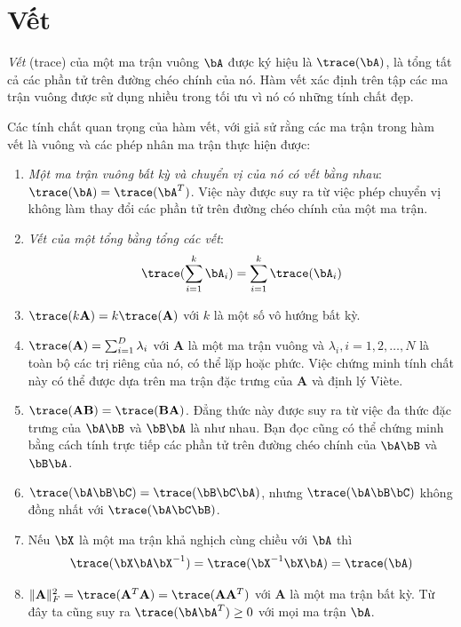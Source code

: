 \section{Vết}
\textit{Vết} (trace) của một ma trận vuông $\bA$ được ký hiệu là $\trace(\bA)$, là tổng
tất cả các phần tử trên đường chéo chính của nó. Hàm vết xác định trên tập các
ma trận vuông được sử dụng nhiều trong tối ưu vì nó có những tính chất đẹp.

Các tính chất quan trọng của hàm vết, với giả sử rằng các ma trận trong hàm
vết là vuông và các phép nhân ma trận thực hiện được:
\begin{enumerate}
    \item \textit{Một ma trận vuông bất kỳ và chuyển vị của nó có vết bằng
    nhau}: $\trace(\bA) = \trace(\bA^T)$. Việc này được suy ra từ việc phép
    chuyển vị không làm thay đổi các phần tử trên đường chéo chính của một ma
    trận.


    \item \textit{Vết của một tổng bằng tổng các vết}: 
    $$\displaystyle\trace(\sum_{i=1}^k \bA_i) = \sum_{i=1}^k \trace(\bA_i)$$

    \item $\trace(k\mathbf{A}) = k\trace(\mathbf{A})$ với $k$ là một
    số vô hướng bất kỳ.

    \item $\trace(\mathbf{A}) = \sum_{i = 1}^D \lambda_i $ với
    $\mathbf{A}$ là một ma trận vuông và $\lambda_i, i = 1, 2, \dots, N$ là toàn
    bộ các trị riêng của nó, có thể lặp hoặc phức. Việc chứng minh tính chất này
    có thể được dựa trên ma trận đặc trưng của $\mathbf{A}$ và định lý Viète.

    \item $\trace(\mathbf{AB}) = \trace(\mathbf{BA})$. Đẳng thức này
    được suy ra từ việc đa thức đặc trưng của $\bA\bB$ và $\bB\bA$ là như nhau.
    Bạn đọc cũng có thể chứng minh bằng cách tính trực tiếp các phần tử trên
    đường chéo chính của $\bA\bB$ và $\bB\bA$.

    \item $\trace(\bA\bB\bC) = \trace(\bB\bC\bA)$, nhưng $\trace(\bA\bB\bC)$
    không đồng nhất với $\trace(\bA\bC\bB)$.

    \item Nếu $\bX$ là một ma trận khả nghịch cùng chiều với $\bA$ thì
    \begin{equation*}
        \trace (\bX\bA\bX^{-1}) = \trace(\bX^{-1}\bX\bA) = \trace(\bA)
    \end{equation*}
    \item $\|\mathbf{A}\|_F^2 = \trace(\mathbf{A}^T\mathbf{A}) =
    \trace(\mathbf{A}\mathbf{A}^T)$ với $\mathbf{A}$ là một ma trận bất kỳ. Từ
    đây ta cũng suy ra $\trace(\bA\bA^T) \geq 0$ với mọi ma trận $\bA$.

\end{enumerate}
